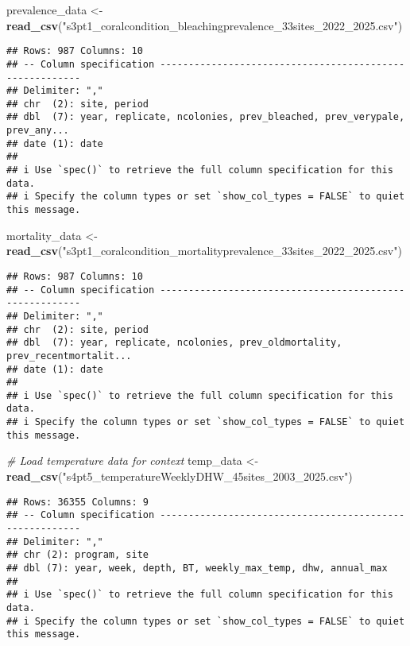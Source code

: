 \documentclass[
]{article}
\newenvironment{Shaded}{\begin{snugshade}}{\end{snugshade}}
\newcommand{\CommentTok}[1]{\textcolor[rgb]{0.56,0.35,0.01}{\textit{#1}}}
\newcommand{\FunctionTok}[1]{\textcolor[rgb]{0.13,0.29,0.53}{\textbf{#1}}}
\newcommand{\NormalTok}[1]{#1}
\newcommand{\OtherTok}[1]{\textcolor[rgb]{0.56,0.35,0.01}{#1}}
\newcommand{\StringTok}[1]{\textcolor[rgb]{0.31,0.60,0.02}{#1}}
\begin{document}
\begin{Shaded}
\begin{Highlighting}[]
\NormalTok{prevalence\_data }\OtherTok{\textless{}{-}} \FunctionTok{read\_csv}\NormalTok{(}\StringTok{"s3pt1\_coralcondition\_bleachingprevalence\_33sites\_2022\_2025.csv"}\NormalTok{)}
\end{Highlighting}
\end{Shaded}

\begin{verbatim}
## Rows: 987 Columns: 10
## -- Column specification --------------------------------------------------------
## Delimiter: ","
## chr  (2): site, period
## dbl  (7): year, replicate, ncolonies, prev_bleached, prev_verypale, prev_any...
## date (1): date
## 
## i Use `spec()` to retrieve the full column specification for this data.
## i Specify the column types or set `show_col_types = FALSE` to quiet this message.
\end{verbatim}

\begin{Shaded}
\begin{Highlighting}[]
\NormalTok{mortality\_data }\OtherTok{\textless{}{-}} \FunctionTok{read\_csv}\NormalTok{(}\StringTok{"s3pt1\_coralcondition\_mortalityprevalence\_33sites\_2022\_2025.csv"}\NormalTok{)}
\end{Highlighting}
\end{Shaded}

\begin{verbatim}
## Rows: 987 Columns: 10
## -- Column specification --------------------------------------------------------
## Delimiter: ","
## chr  (2): site, period
## dbl  (7): year, replicate, ncolonies, prev_oldmortality, prev_recentmortalit...
## date (1): date
## 
## i Use `spec()` to retrieve the full column specification for this data.
## i Specify the column types or set `show_col_types = FALSE` to quiet this message.
\end{verbatim}

\begin{Shaded}
\begin{Highlighting}[]
\CommentTok{\# Load temperature data for context}
\NormalTok{temp\_data }\OtherTok{\textless{}{-}} \FunctionTok{read\_csv}\NormalTok{(}\StringTok{"s4pt5\_temperatureWeeklyDHW\_45sites\_2003\_2025.csv"}\NormalTok{)}
\end{Highlighting}
\end{Shaded}

\begin{verbatim}
## Rows: 36355 Columns: 9
## -- Column specification --------------------------------------------------------
## Delimiter: ","
## chr (2): program, site
## dbl (7): year, week, depth, BT, weekly_max_temp, dhw, annual_max
## 
## i Use `spec()` to retrieve the full column specification for this data.
## i Specify the column types or set `show_col_types = FALSE` to quiet this message.
\end{verbatim}
\end{document}
